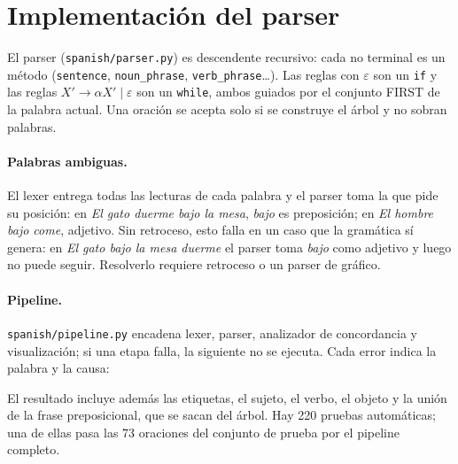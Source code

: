 \section{Implementación del parser}
\label{sec:parser}

El parser (\texttt{spanish/parser.py}) es descendente recursivo: cada no terminal es un método
(\texttt{sentence}, \texttt{noun\_phrase}, \texttt{verb\_phrase}…). Las reglas con
$\varepsilon$ son un \texttt{if} y las reglas $X' \to \alpha X' \mid \varepsilon$ son un
\texttt{while}, ambos guiados por el conjunto FIRST de la palabra actual. Una oración se acepta
solo si se construye el árbol y no sobran palabras.

\paragraph{Palabras ambiguas.} El lexer entrega todas las lecturas de cada palabra y el parser
toma la que pide su posición: en \emph{El gato duerme bajo la mesa}, \emph{bajo} es preposición;
en \emph{El hombre bajo come}, adjetivo. Sin retroceso, esto falla en un caso que la gramática sí
genera: en \emph{El gato bajo la mesa duerme} el parser toma \emph{bajo} como adjetivo y luego no
puede seguir. Resolverlo requiere retroceso o un parser de gráfico.

\paragraph{Pipeline.} \texttt{spanish/pipeline.py} encadena lexer, parser, analizador de
concordancia y visualización; si una etapa falla, la siguiente no se ejecuta. Cada error indica
la palabra y la causa:
\begin{center}
  \small
\end{center}
El resultado incluye además las etiquetas, el sujeto, el verbo, el objeto y la unión de la
frase preposicional, que se sacan del árbol. Hay 220 pruebas automáticas; una de ellas pasa las
73 oraciones del conjunto de prueba por el pipeline completo.

